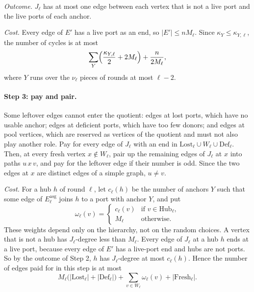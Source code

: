 \documentclass[11pt]{article}
\theoremstyle{definition}
\theoremstyle{remark}
\numberwithin{equation}{section}
\numberwithin{figure}{section}
\numberwithin{table}{section}
\newcommand{\Hub}{\mathrm{Hub}}
\newcommand{\Fresh}{\mathrm{Fresh}}
\newcommand{\Lost}{\mathrm{Lost}}
\newcommand{\Def}{\mathrm{Def}}
\newcommand{\Eas}{E^{\mathrm{asg}}}
\begin{document}
\emph{Outcome.} $J_\ell$ has at most one edge between each vertex that is not a
live port and the live ports of each anchor.

\emph{Cost.} Every edge of $E'$ has a live port as an end, so $|E'|\le nM_\ell$.
Since $\kappa_Y\le\kappa_{Y,\ell}$, the number of cycles is at most
\[
\sum_Y\Bigl(\frac{\kappa_{Y,\ell}}2+2M_\ell\Bigr)+\frac n{2M_\ell},
\]
where $Y$ runs over the $\nu_\ell$ pieces of rounds at most $\ell-2$.

\paragraph{Step 3: pay and pair.} Some leftover edges cannot enter the
quotient: edges at lost ports, which have no usable anchor; edges at deficient
ports, which have too few donors; and edges at pool vertices, which are
reserved as vertices of the quotient and must not also play another role. Pay
for every edge of $J_\ell$ with an end in $\Lost_\ell\cup W_\ell\cup\Def_\ell$.
Then, at every fresh vertex $x\notin W_\ell$, pair up the remaining edges of
$J_\ell$ at $x$ into paths $u\,x\,v$, and pay for the leftover edge if their
number is odd. Since the two edges at $x$ are distinct edges of a simple graph,
$u\ne v$.

\emph{Cost.} For a hub $h$ of round $\ell$, let $c_\ell(h)$ be the number of
anchors $Y$ such that some edge of $\Eas_\ell$ joins $h$ to a port with anchor
$Y$, and put
\[
\omega_\ell(v)=\begin{cases}c_\ell(v)&\text{if }v\in\Hub_\ell,\\
M_\ell&\text{otherwise.}\end{cases}
\]
These weights depend only on the hierarchy, not on the random choices. A vertex
that is not a hub has $J_\ell$-degree less than $M_\ell$. Every edge of
$J_\ell$ at a hub $h$ ends at a live port, because every edge of $E'$ has a
live-port end and hubs are not ports. So by the outcome of Step 2, $h$ has
$J_\ell$-degree at most $c_\ell(h)$. Hence the number of edges paid for in this
step is at most
\begin{equation}\label{eq:step3}
M_\ell\bigl(|\Lost_\ell|+|\Def_\ell|\bigr)+\sum_{v\in W_\ell}\omega_\ell(v)+|\Fresh_\ell|.
\end{equation}
\end{document}
